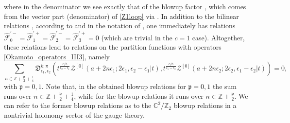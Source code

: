\documentclass[12pt,a4paper]{article}
\numberwithin{equation}{section}
\begin{document}
where in the denominator we see exactly that of the blowup factor \cite[(2.21)]{BST25}, which comes from the vector part (denominator) of \eqref{Z1loop} via \cite[(B.9)]{BST25}. In addition to the bilinear relations \cite[(4.47)]{BS16b}, according to and in the notation of \cite[Sec. 4.4]{BS16b}, one immediately has relations $\widehat{\mathcal{F}}_0^{'-}=\widehat{\mathcal{F}}_1^{'+}=\widehat{\mathcal{F}}_2^{'-}=\widehat{\mathcal{F}}_3^{'+}=0$ (which are trivial in the $c=1$ case).
Altogether, these relations lead to relations on the partition functions with operators \eqref{Okamoto_operators_III3}, namely
\begin{equation}\label{blowup_odd}
\sum_{n\in\mathbb{Z}+\frac{\mathfrak{p}}2+\frac14}\mathfrak{D}^{k;\pi}_{\epsilon_1,\epsilon_2}\left(t^{\frac{\epsilon/8}{\epsilon_2{-}\epsilon_1}}\mathcal{Z}^{[0]}(a+2n\epsilon_1;2\epsilon_1,\epsilon_2{-}\epsilon_1|t),t^{\frac{\epsilon/8}{\epsilon_1{-}\epsilon_2}}\mathcal{Z}^{[0]}(a+2n\epsilon_2;2\epsilon_2,\epsilon_1{-}\epsilon_2|t)\right)=0,
\end{equation}
with $\mathfrak{p}=0,1$.
Note that, in the obtained blowup relations for $\mathfrak{p}=0,1$ the sum runs over $n\in\mathbb{Z}+\frac{\mathfrak{p}}2+\frac14$, while for the blowup relations \cite[(2.12)]{BST25} it runs over $n\in\mathbb{Z}+\frac{\mathfrak{p}}2$.
We can refer to the former blowup relations as to the $\mathbb{C}^2/\mathbb{Z}_2$ blowup relations in a nontrivial holonomy sector of the gauge theory.
\end{document}
